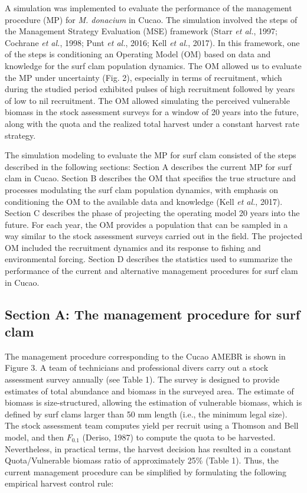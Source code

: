 \documentclass[12pt]{article}
\begin{document}
A simulation was implemented to evaluate the performance of the
management procedure (MP) for \emph{M. donacium} in Cucao. The
simulation involved the steps of the Management Strategy Evaluation
(MSE) framework (Starr \emph{et al.}, 1997; Cochrane \emph{et al.},
1998; Punt \emph{et al.}, 2016; Kell \emph{et al.}, 2017). In this
framework, one of the steps is conditioning an Operating Model (OM)
based on data and knowledge for the surf clam population dynamics. The
OM allowed us to evaluate the MP under uncertainty (Fig. 2), especially
in terms of recruitment, which during the studied period exhibited
pulses of high recruitment followed by years of low to nil recruitment.
The OM allowed simulating the perceived vulnerable biomass in the stock
assessment surveys for a window of 20 years into the future, along with
the quota and the realized total harvest under a constant harvest rate
strategy.

The simulation modeling to evaluate the MP for surf clam consisted of
the steps described in the following sections: Section A describes the
current MP for surf clam in Cucao. Section B describes the OM that
specifies the true structure and processes modulating the surf clam
population dynamics, with emphasis on conditioning the OM to the
available data and knowledge (Kell \emph{et al.}, 2017). Section C
describes the phase of projecting the operating model 20 years into the
future. For each year, the OM provides a population that can be sampled
in a way similar to the stock assessment surveys carried out in the
field. The projected OM included the recruitment dynamics and its
response to fishing and environmental forcing. Section D describes the
statistics used to summarize the performance of the current and
alternative management procedures for surf clam in Cucao.

\hypertarget{section-a-the-management-procedure-for-surf-clam}{%
\subsection{Section A: The management procedure for surf
clam}\label{section-a-the-management-procedure-for-surf-clam}}

The management procedure corresponding to the Cucao AMEBR is shown in
Figure 3. A team of technicians and professional divers carry out a
stock assessment survey annually (see Table 1). The survey is designed
to provide estimates of total abundance and biomass in the surveyed
area. The estimate of biomass is size-structured, allowing the
estimation of vulnerable biomass, which is defined by surf clams larger
than 50 mm length (i.e., the minimum legal size). The stock assessment
team computes yield per recruit using a Thomson and Bell model, and then
\(F_{0.1}\) (Deriso, 1987) to compute the quota to be harvested.
Nevertheless, in practical terms, the harvest decision has resulted in a
constant Quota/Vulnerable biomass ratio of approximately 25\% (Table 1).
Thus, the current management procedure can be simplified by formulating
the following empirical harvest control rule:
\end{document}
